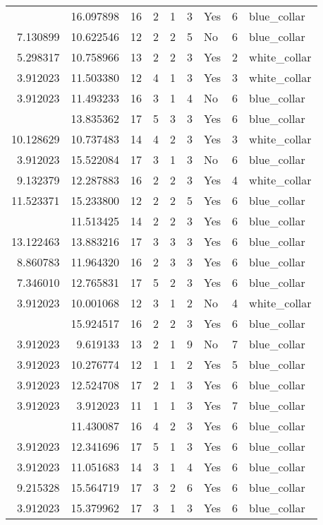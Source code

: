 \documentclass[
]{article}
\begin{document}
\begin{longtable}[t]{rrrrrllrl}
\addlinespace
3.912023 & 16.097898 & 16 & 2 & 1 & 3 & Yes & 6 & blue\_collar\\
7.130899 & 10.622546 & 12 & 2 & 2 & 5 & No & 6 & blue\_collar\\
5.298317 & 10.758966 & 13 & 2 & 2 & 3 & Yes & 2 & white\_collar\\
3.912023 & 11.503380 & 12 & 4 & 1 & 3 & Yes & 3 & white\_collar\\
3.912023 & 11.493233 & 16 & 3 & 1 & 4 & No & 6 & blue\_collar\\
\addlinespace
10.167773 & 13.835362 & 17 & 5 & 3 & 3 & Yes & 6 & blue\_collar\\
10.128629 & 10.737483 & 14 & 4 & 2 & 3 & Yes & 3 & white\_collar\\
3.912023 & 15.522084 & 17 & 3 & 1 & 3 & No & 6 & blue\_collar\\
9.132379 & 12.287883 & 16 & 2 & 2 & 3 & Yes & 4 & white\_collar\\
11.523371 & 15.233800 & 12 & 2 & 2 & 5 & Yes & 6 & blue\_collar\\
\addlinespace
12.206323 & 11.513425 & 14 & 2 & 2 & 3 & Yes & 6 & blue\_collar\\
13.122463 & 13.883216 & 17 & 3 & 3 & 3 & Yes & 6 & blue\_collar\\
8.860783 & 11.964320 & 16 & 2 & 3 & 3 & Yes & 6 & blue\_collar\\
7.346010 & 12.765831 & 17 & 5 & 2 & 3 & Yes & 6 & blue\_collar\\
3.912023 & 10.001068 & 12 & 3 & 1 & 2 & No & 4 & white\_collar\\
\addlinespace
15.255358 & 15.924517 & 16 & 2 & 2 & 3 & Yes & 6 & blue\_collar\\
3.912023 & 9.619133 & 13 & 2 & 1 & 9 & No & 7 & blue\_collar\\
3.912023 & 10.276774 & 12 & 1 & 1 & 2 & Yes & 5 & blue\_collar\\
3.912023 & 12.524708 & 17 & 2 & 1 & 3 & Yes & 6 & blue\_collar\\
3.912023 & 3.912023 & 11 & 1 & 1 & 3 & Yes & 7 & blue\_collar\\
\addlinespace
10.205442 & 11.430087 & 16 & 4 & 2 & 3 & Yes & 6 & blue\_collar\\
3.912023 & 12.341696 & 17 & 5 & 1 & 3 & Yes & 6 & blue\_collar\\
3.912023 & 11.051683 & 14 & 3 & 1 & 4 & Yes & 6 & blue\_collar\\
9.215328 & 15.564719 & 17 & 3 & 2 & 6 & Yes & 6 & blue\_collar\\
3.912023 & 15.379962 & 17 & 3 & 1 & 3 & Yes & 6 & blue\_collar\\

\end{longtable}
\end{document}
